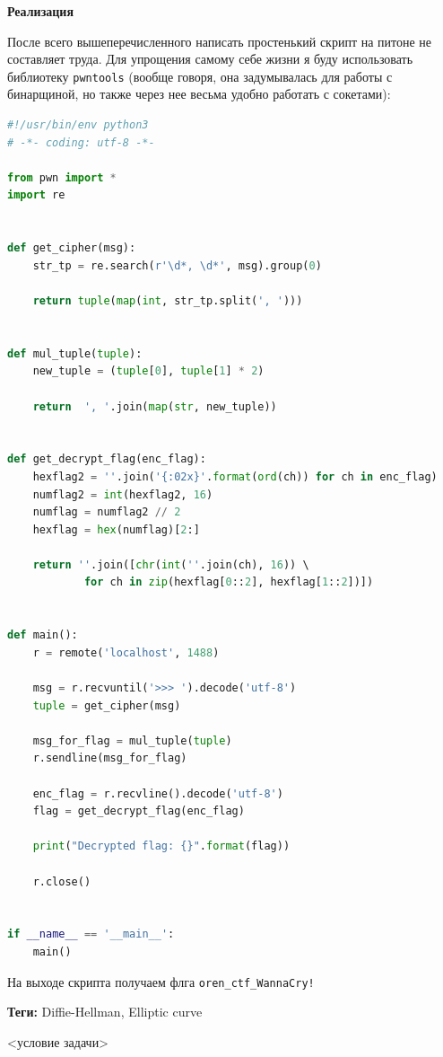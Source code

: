 \documentclass[idxtotoc,hyperref,openany,oneside]{files/crypto} %
\begin{document}
\textbf{Реализация}

После всего вышеперечисленного написать простенький скрипт на питоне не составляет труда. Для упрощения самому себе жизни я буду использовать библиотеку \verb|pwntools| (вообще говоря, она задумывалась для работы с бинарщиной, но также через нее весьма удобно работать с сокетами):
\begin{lstlisting}[language=Python, caption=Взлом криптосистемы Эль-Гамаля]
#!/usr/bin/env python3
# -*- coding: utf-8 -*-

from pwn import *
import re


def get_cipher(msg):
    str_tp = re.search(r'\d*, \d*', msg).group(0)

    return tuple(map(int, str_tp.split(', ')))


def mul_tuple(tuple):
    new_tuple = (tuple[0], tuple[1] * 2)

    return  ', '.join(map(str, new_tuple))


def get_decrypt_flag(enc_flag):
    hexflag2 = ''.join('{:02x}'.format(ord(ch)) for ch in enc_flag)
    numflag2 = int(hexflag2, 16)
    numflag = numflag2 // 2
    hexflag = hex(numflag)[2:]

    return ''.join([chr(int(''.join(ch), 16)) \ 
    		for ch in zip(hexflag[0::2], hexflag[1::2])])


def main():
    r = remote('localhost', 1488)

    msg = r.recvuntil('>>> ').decode('utf-8')
    tuple = get_cipher(msg)

    msg_for_flag = mul_tuple(tuple)
    r.sendline(msg_for_flag)

    enc_flag = r.recvline().decode('utf-8')
    flag = get_decrypt_flag(enc_flag)

    print("Decrypted flag: {}".format(flag))

    r.close()


if __name__ == '__main__':
    main()
\end{lstlisting}

На выходе скрипта получаем флга \verb|oren_ctf_WannaCry!|



\textbf{Теги:} Diffie-Hellman, Elliptic curve\vspace{\baselineskip}

\begin{tcolorbox}
<условие задачи>
\end{tcolorbox}
\end{document}

